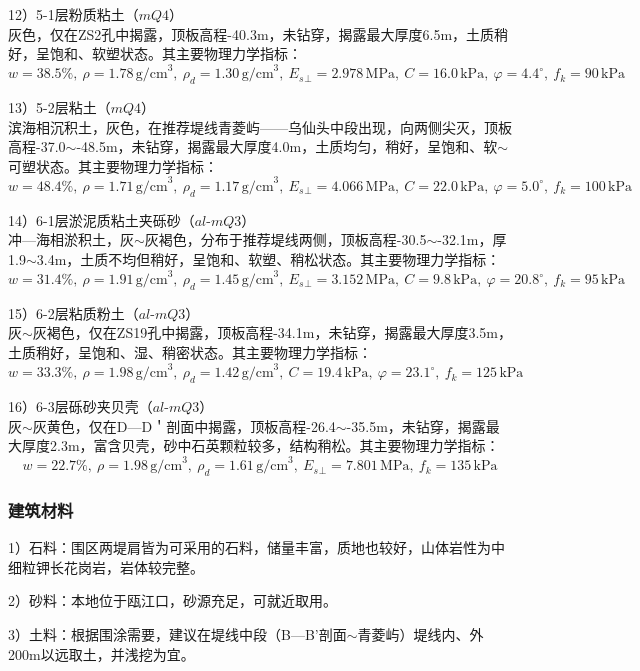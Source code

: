 \documentclass[UTF8, a4paper, 12pt]{ctexart} %
\begin{document}
\par 12）5-1层粉质粘土（$mQ4$）\\
灰色，仅在ZS2孔中揭露，顶板高程-40.3m，未钻穿，揭露最大厚度6.5m，土质稍好，呈饱和、软塑状态。其主要物理力学指标：
\[
w=38.5\%,\ \rho=1.78\, \text{g/cm}^3,\ \rho_d=1.30\, \text{g/cm}^3,\ E_s{_\perp}=2.978\, \text{MPa},\ C=16.0\, \text{kPa},\ \varphi=4.4^\circ,\ f_k=90\, \text{kPa}
\]

\par 13）5-2层粘土（$mQ4$）\\
滨海相沉积土，灰色，在推荐堤线青菱屿——乌仙头中段出现，向两侧尖灭，顶板高程-37.0$\sim$-48.5m，未钻穿，揭露最大厚度4.0m，土质均匀，稍好，呈饱和、软$\sim$可塑状态。其主要物理力学指标：
\[
w=48.4\%,\ \rho=1.71\, \text{g/cm}^3,\ \rho_d=1.17\, \text{g/cm}^3,\ E_s{_\perp}=4.066\, \text{MPa},\ C=22.0\, \text{kPa},\ \varphi=5.0^\circ,\ f_k=100\, \text{kPa}
\]

\par 14）6-1层淤泥质粘土夹砾砂（$al$-$mQ3$）\\
冲—海相淤积土，灰$\sim$灰褐色，分布于推荐堤线两侧，顶板高程-30.5$\sim$-32.1m，厚1.9$\sim$3.4m，土质不均但稍好，呈饱和、软塑、稍松状态。其主要物理力学指标：
\[
w=31.4\%,\ \rho=1.91\, \text{g/cm}^3,\ \rho_d=1.45\, \text{g/cm}^3,\ E_s{_\perp}=3.152\, \text{MPa},\ C=9.8\, \text{kPa},\ \varphi=20.8^\circ,\ f_k=95\, \text{kPa}
\]

\par 15）6-2层粘质粉土（$al$-$mQ3$）\\
灰$\sim$灰褐色，仅在ZS19孔中揭露，顶板高程-34.1m，未钻穿，揭露最大厚度3.5m，土质稍好，呈饱和、湿、稍密状态。其主要物理力学指标：
\[
w=33.3\%,\ \rho=1.98\, \text{g/cm}^3,\ \rho_d=1.42\, \text{g/cm}^3,\ C=19.4\, \text{kPa},\ \varphi=23.1^\circ,\ f_k=125\, \text{kPa}
\]

\par 16）6-3层砾砂夹贝壳（$al$-$mQ3$）\\
灰$\sim$灰黄色，仅在D—D＇剖面中揭露，顶板高程-26.4$\sim$-35.5m，未钻穿，揭露最大厚度2.3m，富含贝壳，砂中石英颗粒较多，结构稍松。其主要物理力学指标：
\[
w=22.7\%,\ \rho=1.98\, \text{g/cm}^3,\ \rho_d=1.61\, \text{g/cm}^3,\ E_s{_\perp}=7.801\, \text{MPa},\ f_k=135\, \text{kPa}
\]

\subsubsection{建筑材料}
\par 1）石料：围区两堤肩皆为可采用的石料，储量丰富，质地也较好，山体岩性为中细粒钾长花岗岩，岩体较完整。
\par 2）砂料：本地位于瓯江口，砂源充足，可就近取用。
\par 3）土料：根据围涂需要，建议在堤线中段（B—B’剖面$\sim$青菱屿）堤线内、外200m以远取土，并浅挖为宜。
\end{document}

